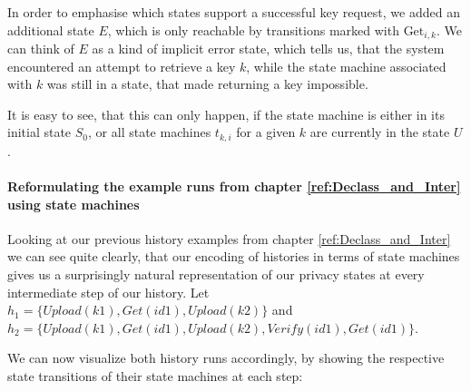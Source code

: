 In order to emphasise which states support a successful key request, we added an additional state \(E\), which is only reachable by transitions marked with \(\text{Get}_{i,k}\). We can think of \(E\) as a kind of implicit error state, which tells us, that the system encountered an attempt to retrieve a key \(k\), while the state machine associated with \(k\) was still in a state, that made returning a key impossible. 

It is easy to see, that this can only happen, if the state machine is either in its initial state \(S_0\), or all state machines \(t_{k,i}\) for a given \(k\) are currently in the state \(U\).
\\
\paragraph{Reformulating the example runs from chapter \ref{ref:Declass_and_Inter} using state machines}
Looking at our previous history examples from chapter \ref{ref:Declass_and_Inter} we can see quite clearly, that our encoding of histories in terms of state machines gives us a surprisingly natural representation of our privacy states at every intermediate step of our history.
Let \(h_1=\{Upload(k1),Get(id1),Upload(k2)\}\) and \(h_2 = \{Upload(k1),Get(id1),Upload(k2),Verify(id1),Get(id1)\}\).

We can now visualize both history runs accordingly, by showing the respective state transitions of their state machines at each step:

